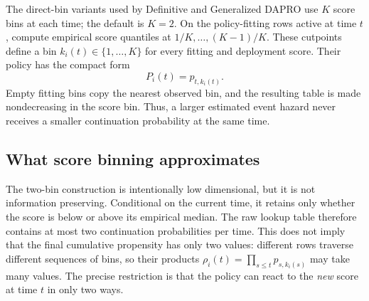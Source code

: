 The direct-bin variants used by Definitive and Generalized DAPRO use $K$
score bins at each time; the default is $K=2$.  On the policy-fitting rows
active at time $t$, compute empirical score quantiles at
$1/K,\ldots,(K-1)/K$.  These cutpoints define a bin
$k_i(t)\in\{1,\ldots,K\}$ for every fitting and deployment score.  Their
policy has the compact form
\begin{equation}
    P_i(t)=p_{t,k_i(t)}.
    \label{eq:score_bin_policy}
\end{equation}
Empty fitting bins copy the nearest observed bin, and the resulting table is
made nondecreasing in the score bin.  Thus, a larger estimated event hazard
never receives a smaller continuation probability at the same time.

\subsection{What score binning approximates}
\label{sec:dapro_score_quantization}

The two-bin construction is intentionally low dimensional, but it is not
information preserving.  Conditional on the current time, it retains only
whether the score is below or above its empirical median.  The raw lookup
table therefore contains at most two continuation probabilities per time.
This does not imply that the final cumulative propensity has only two values:
different rows traverse different sequences of bins, so their products
$\rho_i(t)=\prod_{s\leq t}p_{s,k_i(s)}$ may take many values.  The precise
restriction is that the policy can react to the \emph{new} score at time $t$
in only two ways.

